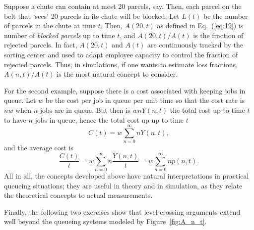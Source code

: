Suppose a chute can contain at most 20 parcels, say. Then, each parcel
on the belt that `sees' 20 parcels in its chute will be blocked. Let
$L(t)$ be the number of parcels in the chute at time $t$. Then,
$A(20,t)$ as defined in Eq.~(\ref{eq:19}) is number of\emph{ blocked
  parcels} up to time $t$, and $A(20,t)/A(t)$ is the fraction of
rejected parcels. In fact, $A(20,t)$ and $A(t)$ are continuously
tracked by the sorting center and used to adapt employee capacity to
control the fraction of rejected parcels. Thus, in simulations, if one
wants to estimate loss fractions, $A(n,t)/A(t)$ is the most natural
concept to consider.

For the second example, suppose there is a cost associated with
keeping jobs in queue. Let $w$ be the cost per job in queue per unit
time so that the cost rate is $n w$ when $n$ jobs are in queue. But
then is $ w n Y(n,t)$ the total cost up to time $t$ to have $n$ jobs in
queue, hence the total cost up up to time $t$
  \begin{equation*}
C(t) =     w \sum_{n=0}^\infty n Y(n,t),
  \end{equation*}
and the average cost is
\begin{equation*}
\frac{C(t)}t =    w \sum_{n=0}^\infty n \frac{Y(n,t)}t = w \sum_{n=0}^\infty n p(n,t).
\end{equation*}
All in all, the concepts developed above have natural interpretations
in practical queueing situations; they are useful in theory and in
simulation, as they relate the theoretical concepts to actual measurements.


Finally, the following two exercises show that level-crossing arguments extend well beyond the queueing systems modeled by Figure~\ref{fig:A_n_t}.

